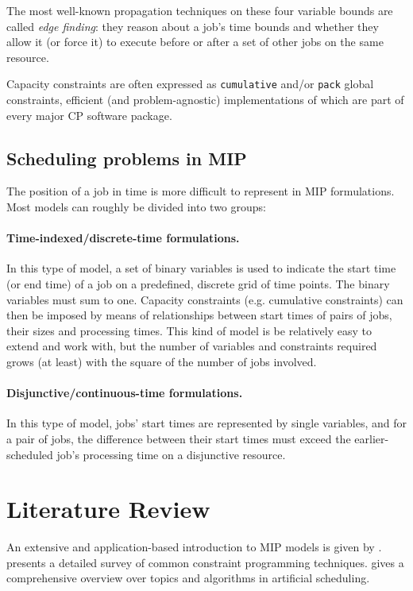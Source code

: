\documentclass[13pt, letterpaper, oneside]{book}
\begin{document}
The most well-known propagation techniques on these four variable bounds are
called \textit{edge finding}: they reason about a job's time bounds and whether
they allow it (or force it) to execute before or after a set of other jobs on
the same resource.

Capacity constraints are often expressed as \texttt{cumulative} and/or
\texttt{pack} global constraints, efficient (and problem-agnostic)
implementations of which are part of every major CP software package.

\subsection{Scheduling problems in MIP}
The position of a job in time is more difficult to represent in MIP
formulations. Most models can roughly be divided into two groups:

\paragraph{Time-indexed/discrete-time formulations.} In this type of model, a set of binary
variables is used to indicate the start time (or end time) of a job on a
predefined, discrete grid of time points. The binary variables must sum to one.
Capacity constraints (e.g. cumulative constraints) can then be imposed by means
of relationships between start times of pairs of jobs, their sizes and
processing times. This kind of model is be relatively easy to extend and work
with, but the number of variables and constraints required grows (at least) with
the square of the number of jobs involved.

\paragraph{Disjunctive/continuous-time formulations.}
In this type of model, jobs' start times are represented by single variables,
and for a pair of jobs, the difference between their start times must exceed the
earlier-scheduled job's processing time on a disjunctive resource.

\section{Literature Review}
\label{sec:backgroundlit}
An extensive and application-based introduction to MIP models is given by
\citet{williams}. \citet{bartak} presents a detailed survey of common constraint
programming techniques. \citet{pinedo} gives a comprehensive overview over
topics and algorithms in artificial scheduling.
\end{document}
